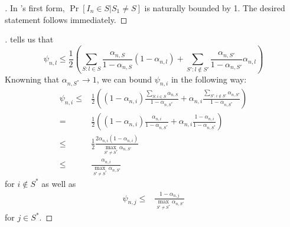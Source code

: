 \begin{proof}[]
  In 's first form,  $\Pr[I_n \in S | S_1 \neq S]$ is naturally bounded by 1. The desired statement follows immediately.
\end{proof}

\begin{proof}[]
   tells us that
  \[\psi_{n, l} \leq \frac{1}{2}(\sum_{S: l \in S} \frac{\alpha_{n, S}}{1 - \alpha_{n, S}} (1 - \alpha_{n, l}) +  \sum_{S': l \notin S'} \frac{\alpha_{n, S'}}{1 - \alpha_{n, S'}} \alpha_{n, l})\]
  Knowning that $\alpha_{n, S^*} \rightarrow 1$, we can bound $\psi_{n, i}$ in the following way:
  \begin{align}
    \psi_{n, i} \leq& \frac{1}{2}((1 - \alpha_{n, i}) \frac{\sum_{S: i \in S} \alpha_{n, S}}{1 - \alpha_{n, S^*}} + \alpha_{n, i} \frac{\sum_{S': i \notin S'} \alpha_{n, S'}}{1 - \alpha_{n, S^*}}) \\
    =& \frac{1}{2}((1 - \alpha_{n, i}) \frac{\alpha_{n, i}}{1 - \alpha_{n, S^*}} + \alpha_{n, i} \frac{1 - \alpha_{n, i}}{1 - \alpha_{n, S^*}}) \\
    \leq& \frac{1}{2} \frac{2 \alpha_{n, i} (1 - \alpha_{n, i})}{\max_{S' \neq S^*} \alpha_{n, S'}} \\
    \leq& \frac{\alpha_{n, i}}{\max_{S' \neq S^*} \alpha_{n, S'}}
  \end{align}
  for $i \notin S^*$ as well as
  \begin{align}
    \psi_{n, j} \leq& \frac{1 - \alpha_{n, j}}{\max_{S' \neq S^*} \alpha_{n, S'}}
  \end{align}
  for $j \in S^*$.
\end{proof}

